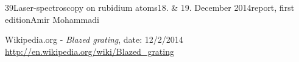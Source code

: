 \documentclass[a4paper, parskip=half, 12pt, bibliography=totocnumbered]{scrartcl}
\begin{document}
{39}{Laser-spectroscopy on rubidium atoms}{18. \& 19. December 2014}{report, first edition}{Amir Mohammadi}{}




\begin{thebibliography}{10}
 Wikipedia.org - \emph{Blazed grating}, date: 12/2/2014\\
\url{http://en.wikipedia.org/wiki/Blazed_grating}
\end{thebibliography}
\end{document}
